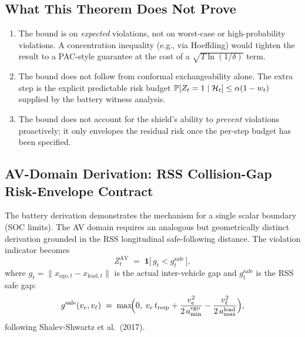 \subsection{What This Theorem Does Not Prove}

\begin{enumerate}
  \item The bound is on \emph{expected} violations, not on worst-case
    or high-probability violations.  A concentration inequality
    (e.g., via Hoeffding) would tighten the result to a PAC-style
    guarantee at the cost of a $\sqrt{T \ln(1/\delta)}$ term.
  \item The bound does not follow from conformal exchangeability alone.
    The extra step is the explicit predictable risk budget
    $\operatorname{\mathbb{P}}[Z_t=1\mid\mathcal{H}_t] \le \alpha(1-w_t)$ supplied by the battery
    witness analysis.
  \item The bound does not account for the shield's ability to
    \emph{prevent} violations proactively; it only envelopes the residual
    risk once the per-step budget has been specified.
\end{enumerate}

\subsection{AV-Domain Derivation: RSS Collision-Gap Risk-Envelope Contract}
\label{sec:av-risk-envelope}

The battery derivation demonstrates the mechanism for a single scalar boundary
(SOC limits).  The AV domain requires an analogous but geometrically distinct
derivation grounded in the RSS longitudinal safe-following distance.  The
violation indicator becomes
\[
  Z_t^{\text{AV}} \;=\; \mathbf{1}\!\bigl[\,g_t < g_t^{\text{safe}}\,\bigr],
\]
where $g_t = \|x_{\text{ego},t} - x_{\text{lead},t}\|$ is the actual inter-vehicle
gap and $g_t^{\text{safe}}$ is the RSS safe gap:
\[
  g^{\text{safe}}(v_e, v_\ell)
  \;=\;
  \max\!\Bigl(0,\;
    v_e\,t_{\text{resp}}
    + \frac{v_e^2}{2\,a_{\min}^{\text{ego}}}
    - \frac{v_\ell^2}{2\,a_{\max}^{\text{lead}}}
  \Bigr),
\]
following Shalev-Shwartz et al.\ (2017).

